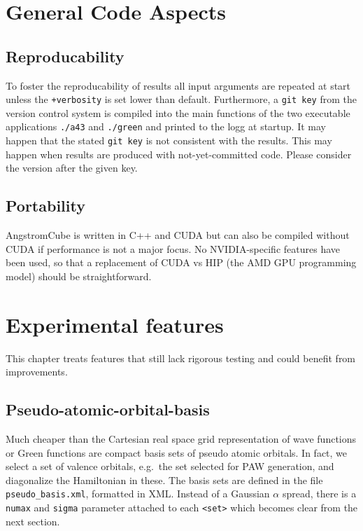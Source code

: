 \documentclass[oribibl]{llncs}
\newcommand{\ttt}[1]{\texttt{#1}}
\newcommand{\fullcodename}{AngstromCube}
\begin{document}
\newpage

\section{General Code Aspects}

\subsection{Reproducability}
%
To foster the reproducability of results all input arguments are repeated at start 
unless the \ttt{+verbosity} is set lower than default.
Furthermore, a \ttt{git key} from the version control system is compiled into the main functions
of the two executable applications \ttt{./a43} and \ttt{./green}
and printed to the logg at startup.
It may happen that the stated \ttt{git key} is not consistent with the results.
This may happen when results are produced with not-yet-committed code.
Please consider the version after the given key.

\subsection{Portability}
%
\fullcodename{} is written in C++ and CUDA but can also be compiled without CUDA 
if performance is not a major focus. No NVIDIA-specific features have been used,
so that a replacement of CUDA vs HIP (the AMD GPU programming model) should be straightforward. 








\newpage
%

\section{Experimental features}
This chapter treats features that still lack rigorous testing and could benefit from improvements.

\subsection{Pseudo-atomic-orbital-basis}
Much cheaper than the Cartesian real space grid representation of wave functions or Green functions
are compact basis sets of pseudo atomic orbitals.
In fact, we select a set of valence orbitals, e.g.~the set selected for \ac{PAW} generation,
and diagonalize the Hamiltonian in these.
The basis sets are defined in the file \ttt{pseudo\_basis.xml}, formatted in \ac{XML}.
Instead of a Gaussian $\alpha$ spread, there is a \ttt{numax} and \ttt{sigma} parameter attached to each \ttt{<set>} which becomes clear from the next section.
\end{document}
